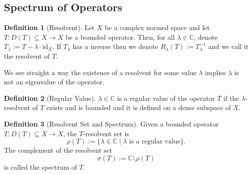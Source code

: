 \documentclass[]{article}
\theoremstyle{definition}
\theoremstyle{definition}
\newtheorem{definition}{Definition}[section]
\begin{document}


\subsection{Spectrum of Operators}

\begin{definition}[Resolvent]
  Let \(X\) be a complex normed space and let \(T : D(T) \subseteq X \to X\) 
  be a bounded operator. Then, for all \(\lambda \in \mathbb{C}\), denote 
  \(T_\lambda := T - \lambda \cdot \text{id}_X\). If \(T_\lambda\) has 
  a inverse then we denote \(R_\lambda(T) := T_\lambda^{-1}\) and we call 
  it the resolvent of \(T\).
\end{definition}

We see straight a way the existence of a resolvent for some value \(\lambda\) 
implies \(\lambda\) is not an eigenvalue of the operator.

\begin{definition}[Regular Value]
  \(\lambda \in \mathbb{C}\) is a regular value of the operator \(T\) if 
  the \(\lambda\)-resolvent of \(T\) exists and is bounded and it is defined 
  on a dense subspace of \(X\).
\end{definition}

\begin{definition}[Resolvent Set and Spectrum]
  Given a bounded operator \(T : D(T) \subseteq X \to X\), the \(T\)-resolvent 
  set is 
  \[\rho(T) := \{\lambda \in \mathbb{C} \mid \lambda \text{ is a regular value}\}.\]
  The complement of the resolvent set 
  \[\sigma(T) := \mathbb{C} \setminus \rho(T)\]
  is called the spectrum of \(T\). 
\end{definition}
\end{document}
